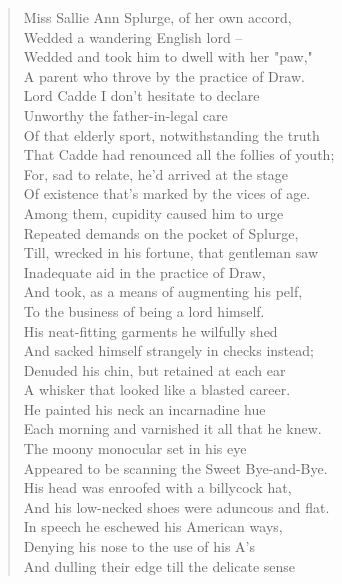\documentclass[11pt]{article}
\begin{document}
\begin{quote}   Miss Sallie Ann Splurge, of her own accord, \\
  Wedded a wandering English lord -- \\
  Wedded and took him to dwell with her "paw," \\
  A parent who throve by the practice of Draw. \\
  Lord Cadde I don't hesitate to declare \\
  Unworthy the father-in-legal care \\
  Of that elderly sport, notwithstanding the truth \\
  That Cadde had renounced all the follies of youth; \\
  For, sad to relate, he'd arrived at the stage \\
  Of existence that's marked by the vices of age. \\
  Among them, cupidity caused him to urge \\
  Repeated demands on the pocket of Splurge, \\
  Till, wrecked in his fortune, that gentleman saw \\
  Inadequate aid in the practice of Draw, \\
  And took, as a means of augmenting his pelf, \\
  To the business of being a lord himself. \\
  His neat-fitting garments he wilfully shed \\
  And sacked himself strangely in checks instead; \\
  Denuded his chin, but retained at each ear \\
  A whisker that looked like a blasted career. \\
  He painted his neck an incarnadine hue \\
  Each morning and varnished it all that he knew. \\
  The moony monocular set in his eye \\
  Appeared to be scanning the Sweet Bye-and-Bye. \\
  His head was enroofed with a billycock hat, \\
  And his low-necked shoes were aduncous and flat. \\
  In speech he eschewed his American ways, \\
  Denying his nose to the use of his A's \\
  And dulling their edge till the delicate sense \\

\end{quote}
\end{document}
